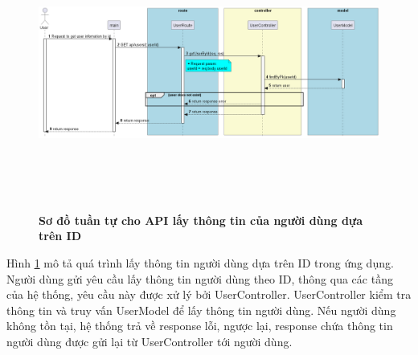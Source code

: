 \begin{figure}[H]
  \centering
  \includegraphics[width=16cm,height=9cm]{Images/server/sequence/server/getUserById.png}
  \caption[Sơ đồ tuần tự cho API lấy thông tin của người dùng dựa trên ID ]{\bfseries \fontsize{12pt}{0pt}
  \selectfont Sơ đồ tuần tự cho API lấy thông tin của người dùng dựa trên ID }
  \label{getUserById} %
\end{figure}
Hình \ref{getUserById} mô tả quá trình lấy thông tin người dùng dựa trên ID trong ứng dụng. Người dùng gửi yêu cầu lấy thông tin người dùng theo ID, thông qua các tầng của hệ thống, yêu cầu này được xử lý bởi UserController. UserController kiểm tra thông tin và truy vấn UserModel để lấy thông tin người dùng. Nếu người dùng không tồn tại, hệ thống trả về response lỗi, ngược lại, response chứa thông tin người dùng được gửi lại từ UserController tới người dùng.


